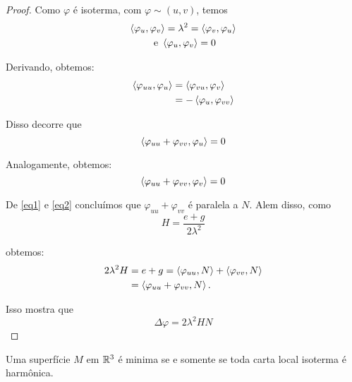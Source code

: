 \begin{proof}
	Como $\varphi$ é isoterma, com $\varphi \sim (u, v)$, temos
	\begin{gather*}
		\left\langle \varphi_u,\varphi_v \right\rangle = \lambda^2 = \left\langle \varphi_v,\varphi_u \right\rangle \\
		\text{ e } \left\langle \varphi_u,\varphi_v \right\rangle = 0
	\end{gather*}
	
	Derivando, obtemos:
	\begin{align*}
		\left\langle \varphi_{uu},\varphi_u \right\rangle &= \left\langle \varphi_{vu},\varphi_v \right\rangle\\
		&= - \left\langle \varphi_u,\varphi_{vv} \right\rangle
	\end{align*}
	
	Disso decorre que
	\begin{equation}\label{eq1}
		\left\langle \varphi_{uu} + \varphi_{vv},\varphi_u \right\rangle = 0
	\end{equation}
	
	Analogamente, obtemos:
	\begin{equation}\label{eq2}
		\left\langle \varphi_{uu} + \varphi_{vv},\varphi_v \right\rangle = 0
	\end{equation}
	
	De \ref{eq1} e \ref{eq2} concluímos que $\varphi_{uu} + \varphi_{vv}$ é paralela a $N$. Alem disso, como
	\begin{equation}
		H = \frac{e+g}{2 \lambda^2}
	\end{equation}
	
	obtemos:
	\begin{align*}
		2 \lambda^2 H &= e + g = \left\langle \varphi_{uu},N \right\rangle + \left\langle \varphi_{vv},N \right\rangle\\
		&= \left\langle \varphi_{uu} + \varphi_{vv},N \right\rangle.
	\end{align*}
	
	Isso mostra que
	\begin{equation}
		\Delta \varphi = 2 \lambda^2 H N
	\end{equation}
\end{proof}

\begin{corolario}
	Uma superfície $M$ em $\mathbb{R}^3$ é minima se e somente se toda carta local isoterma é harmônica.
\end{corolario}

